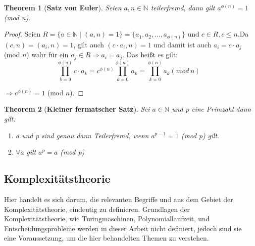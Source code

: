 \documentclass[12pt,oneside]{article}
\newtheorem{theorem}{Theorem}[section]
\theoremstyle{remark}
\theoremstyle{definition}
\begin{document}
\smallskip
\begin{theorem}[\textbf{Satz von Euler}]\label{Th_1}
Seien $a,n \in \mathbb{N}$ teilerfremd, \newline dann gilt $a^{\phi(n)} = 1 $(mod n).
\end{theorem}

\begin{proof}
    
Seien $R =\{ a \in \mathbb{N} \mid (a,n) = 1 \} =  \{a_{1}, a_{2},...,a_{\phi(n)} \}$ und $c \in R, c \leq n$.\newline\newline Da $(c,n) = (a_{i},n) = 1$, gilt auch $(c \cdot a_{i}, n) = 1$ \newline\newline und damit ist auch $a_{i} = c \cdot a_{j}$(mod $n$) wahr für ein $a_{j} \in R \Rightarrow a_{i} = a_{j}$. Das heißt es gilt:\newline
\begin{equation}
     \prod_{k = 0}^{\phi(n)} c \cdot a_{k} =
     c^{\phi(n)}\prod_{k = 0}^{\phi(n)} a_{k} = \prod_{k = 0}^{\phi(n)}  a_{k} (mod \, n )
\end{equation}
    
     $\Rightarrow c^{\phi(n)} = 1$ (mod $n$).

\end{proof}

\smallskip

\begin{theorem}[\textbf{Kleiner fermatscher Satz}]\label{Th_2}
Sei $a \in \mathbb{N}$ und p eine Primzahl dann gilt:\newline
\begin{enumerate}
    \item a und p sind genau dann Teilerfremd, wenn $a^{p-1} = 1 $ (mod p) gilt.
    \newline
    \item $\forall a $ gilt  $a^p = a$ (mod p)
\end{enumerate}
\end{theorem}


\subsection{Komplexitätstheorie}

Hier handelt es sich darum, die relevanten Begriffe und aus dem Gebiet der Komplexitätstheorie, eindeutig zu definieren. Grundlagen der Komplexitätstheorie, wie Turingmaschinen, Polynomiallaufzeit, und Entscheidungsprobleme werden in dieser Arbeit nicht definiert, jedoch sind sie eine Voraussetzung, um die hier behandelten Themen zu verstehen.   
\end{document}

